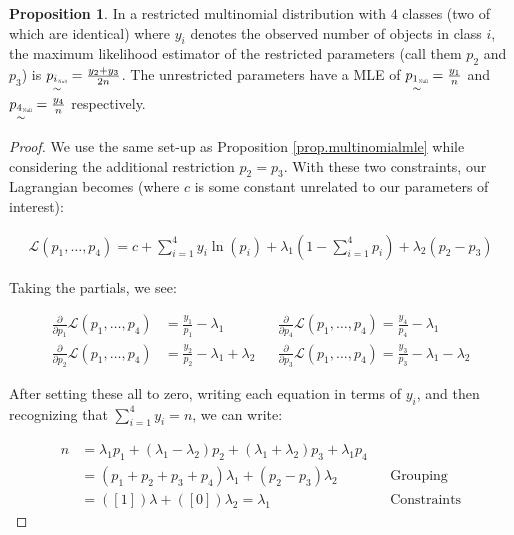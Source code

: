 \documentclass[12pt, letterpaper]{article}
\theoremstyle{definition}
\newtheorem{prop}{Proposition}[theorem]
\numberwithin{equation}{section}
\newcommand{\+}[1]{+_{\scalebox{.375}{#1}}}
\newcommand{\1}{\mathbbm{1}}
\begin{document}
\newpage
\begin{prop}\label{prop.restrictedmle}
	In a restricted multinomial distribution with $4$ classes (two of which are identical) where $y_i$ denotes the observed number of objects in class $i$, the maximum likelihood estimator of the restricted parameters (call them $p_{2}$ and $p_{3}$) is $\underset{\sim}{{p_i}_{\scalebox{.35}{Null}}}=\frac{y_2+y_3}{2n}$. The unrestricted parameters have a MLE of $\underset{\sim}{{p_1}_{\scalebox{.35}{Null}}}=\frac{y_1}{n}$ and $\underset{\sim}{{p_4}_{\scalebox{.35}{Null}}}=\frac{y_4}{n}$ respectively.
	
	\begin{proof}
	We use the same set-up as Proposition \ref{prop.multinomialmle} while considering the additional restriction $p_2=p_3$. With these two constraints, our Lagrangian becomes (where $c$ is some constant unrelated to our parameters of interest):
	
	\vspace{-0.5cm}
	\begin{align*}
		\mathcal{L}(p_1,\dots, p_4)=c+\sum\limits_{i=1}^{4}y_i \ln(p_i)+\lambda_1(1-\sum\limits_{i=1}^{4}p_i)+\lambda_2(p_2-p_3)
	\end{align*}

	Taking the partials, we see:
	
	\vspace{-0.5cm}
	\begin{align*}
		\frac{\partial}{\partial p_1} \mathcal{L}(p_1, \dots, p_4)&=\frac{y_1}{p_1}-\lambda_1 && 	\frac{\partial}{\partial p_4} \mathcal{L}(p_1, \dots, p_4)=\frac{y_4}{p_4}-\lambda_1\\
		\frac{\partial}{\partial p_2} \mathcal{L}(p_1, \dots, p_4)&=\frac{y_2}{p_2}-\lambda_1+\lambda_2 &&
		\frac{\partial}{\partial p_3} \mathcal{L}(p_1, \dots, p_4)=\frac{y_3}{p_3}-\lambda_1-\lambda_2
	\end{align*}

	After setting these all to zero, writing each equation in terms of $y_i$, and then recognizing that $\sum\limits_{i=1}^{4}y_i=n$, we can write:
	
	\vspace{-0.5cm}
	\begin{align*}
		n&=\lambda_1p_1+(\lambda_1-\lambda_2)p_2+(\lambda_1+\lambda_2)p_3+\lambda_1p_4\\
		&=(p_1+p_2+p_3+p_4)\lambda_1+(p_2-p_3)\lambda_2 &&\text{Grouping}\\
		&=([1])\lambda+([0])\lambda_2=\lambda_1 &&\text{Constraints}
	\end{align*}


\end{proof}
\end{prop}
\end{document}
